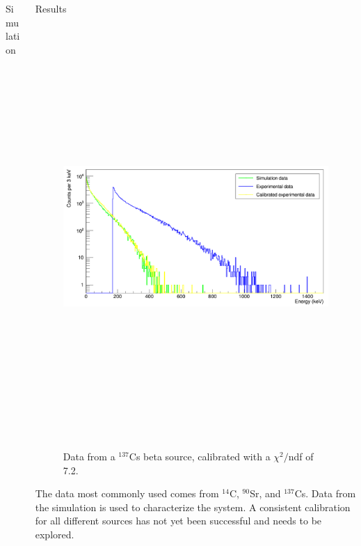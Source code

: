 \documentclass[final]{beamer}
\newlength{\onecolwid}
\newlength{\twocolwid}
\begin{document}
\begin{frame}[t]
\begin{columns}[t]
\begin{column}{\twocolwid}
\begin{columns}[t,totalwidth=\twocolwid]
\begin{column}{\onecolwid}
\begin{block}{Simulation}
\end{block}


\end{column} %

\begin{column}{\onecolwid} %


\begin{block}{Results}

\begin{figure}
\includegraphics[width=0.8\linewidth,height=16cm]{Cs-calibrated.png}
\caption{Data from a $^{137}$Cs beta source, calibrated with a $\chi^2/$ndf of 7.2.}
\label{fig:cs}
\end{figure}

The data most commonly used comes from $^{14}$C, $^{90}$Sr, and $^{137}$Cs. Data from the simulation is used to characterize the system. A consistent calibration for all different sources has not yet been successful and needs to be explored.


\end{block}
\end{column}
\end{columns}
\end{column}
\end{columns}
\end{frame}
\end{document}
